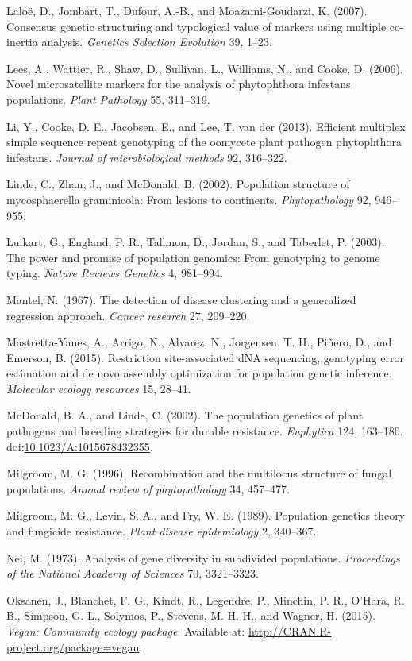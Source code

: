 \documentclass{frontiersSCNS} %
\begin{document}
Lalo{ë}, D., Jombart, T., Dufour, A.-B., and Moazami-Goudarzi, K.
(2007). Consensus genetic structuring and typological value of markers
using multiple co-inertia analysis. \emph{Genetics Selection Evolution}
39, 1--23.

Lees, A., Wattier, R., Shaw, D., Sullivan, L., Williams, N., and Cooke,
D. (2006). Novel microsatellite markers for the analysis of phytophthora
infestans populations. \emph{Plant Pathology} 55, 311--319.

Li, Y., Cooke, D. E., Jacobsen, E., and Lee, T. van der (2013).
Efficient multiplex simple sequence repeat genotyping of the oomycete
plant pathogen phytophthora infestans. \emph{Journal of microbiological
methods} 92, 316--322.

Linde, C., Zhan, J., and McDonald, B. (2002). Population structure of
mycosphaerella graminicola: From lesions to continents.
\emph{Phytopathology} 92, 946--955.

Luikart, G., England, P. R., Tallmon, D., Jordan, S., and Taberlet, P.
(2003). The power and promise of population genomics: From genotyping to
genome typing. \emph{Nature Reviews Genetics} 4, 981--994.

Mantel, N. (1967). The detection of disease clustering and a generalized
regression approach. \emph{Cancer research} 27, 209--220.

Mastretta-Yanes, A., Arrigo, N., Alvarez, N., Jorgensen, T. H.,
Pi{ñ}ero, D., and Emerson, B. (2015). Restriction site-associated dNA
sequencing, genotyping error estimation and de novo assembly
optimization for population genetic inference. \emph{Molecular ecology
resources} 15, 28--41.

McDonald, B. A., and Linde, C. (2002). The population genetics of plant
pathogens and breeding strategies for durable resistance.
\emph{Euphytica} 124, 163--180.
doi:\href{http://dx.doi.org/10.1023/A:1015678432355}{10.1023/A:1015678432355}.

Milgroom, M. G. (1996). Recombination and the multilocus structure of
fungal populations. \emph{Annual review of phytopathology} 34, 457--477.

Milgroom, M. G., Levin, S. A., and Fry, W. E. (1989). Population
genetics theory and fungicide resistance. \emph{Plant disease
epidemiology} 2, 340--367.

Nei, M. (1973). Analysis of gene diversity in subdivided populations.
\emph{Proceedings of the National Academy of Sciences} 70, 3321--3323.

Oksanen, J., Blanchet, F. G., Kindt, R., Legendre, P., Minchin, P. R.,
O'Hara, R. B., Simpson, G. L., Solymos, P., Stevens, M. H. H., and
Wagner, H. (2015). \emph{Vegan: Community ecology package}. Available
at: \url{http://CRAN.R-project.org/package=vegan}.
\end{document}

